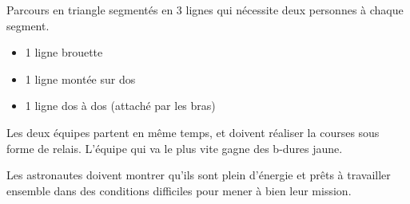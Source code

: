 \documentclass{grand-jeu}
\begin{document}
\begin{liste-materiel}
\end{liste-materiel}

\begin{regles}
 Parcours en triangle segmentés en 3 lignes qui nécessite deux personnes à chaque segment.
 
\begin{itemize}
  \item 1 ligne brouette
  \item 1 ligne montée sur dos
  \item 1 ligne dos à dos (attaché par les bras)
\end{itemize}

Les deux équipes partent en même temps, et doivent réaliser la courses sous forme de relais. L’équipe qui va le plus vite gagne des b-dures jaune. 
\end{regles}

\begin{imaginaire}
Les astronautes doivent montrer qu'ils sont plein d'énergie et prêts à travailler ensemble dans des conditions difficiles pour mener à bien leur mission.  
\end{imaginaire}

\begin{moments-stop}
\end{moments-stop}
\end{document}
